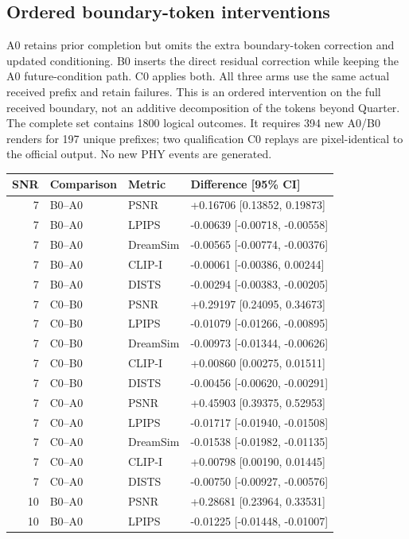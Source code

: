 \documentclass[10pt,letterpaper]{article}
\begin{document}
\subsection{Ordered boundary-token interventions}
A0 retains prior completion but omits the extra boundary-token correction and updated conditioning. B0 inserts the direct residual correction while keeping the A0 future-condition path. C0 applies both. All three arms use the same actual received prefix and retain failures. This is an ordered intervention on the full received boundary, not an additive decomposition of the tokens beyond Quarter. The complete set contains 1800 logical outcomes. It requires 394 new A0/B0 renders for 197 unique prefixes; two qualification C0 replays are pixel-identical to the official output. No new PHY events are generated.

\begin{longtable}{@{}rlll@{}}\toprule
SNR & Comparison & Metric & Difference [95\% CI]\\\midrule\endhead
7 & B0--A0 & PSNR & +0.16706 [0.13852, 0.19873]\\
7 & B0--A0 & LPIPS & -0.00639 [-0.00718, -0.00558]\\
7 & B0--A0 & DreamSim & -0.00565 [-0.00774, -0.00376]\\
7 & B0--A0 & CLIP-I & -0.00061 [-0.00386, 0.00244]\\
7 & B0--A0 & DISTS & -0.00294 [-0.00383, -0.00205]\\
7 & C0--B0 & PSNR & +0.29197 [0.24095, 0.34673]\\
7 & C0--B0 & LPIPS & -0.01079 [-0.01266, -0.00895]\\
7 & C0--B0 & DreamSim & -0.00973 [-0.01344, -0.00626]\\
7 & C0--B0 & CLIP-I & +0.00860 [0.00275, 0.01511]\\
7 & C0--B0 & DISTS & -0.00456 [-0.00620, -0.00291]\\
7 & C0--A0 & PSNR & +0.45903 [0.39375, 0.52953]\\
7 & C0--A0 & LPIPS & -0.01717 [-0.01940, -0.01508]\\
7 & C0--A0 & DreamSim & -0.01538 [-0.01982, -0.01135]\\
7 & C0--A0 & CLIP-I & +0.00798 [0.00190, 0.01445]\\
7 & C0--A0 & DISTS & -0.00750 [-0.00927, -0.00576]\\
10 & B0--A0 & PSNR & +0.28681 [0.23964, 0.33531]\\
10 & B0--A0 & LPIPS & -0.01225 [-0.01448, -0.01007]\\

\end{longtable}
\end{document}
